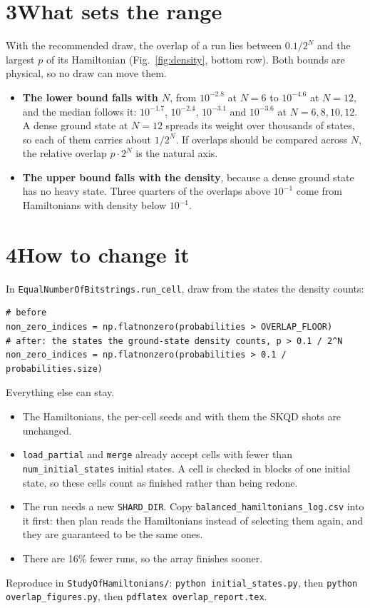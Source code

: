\documentclass[10pt,a4paper]{article}
\begin{document}
\section*{3\quad What sets the range}
With the recommended draw, the overlap of a run lies between $0.1/2^N$ and the largest $p$ of
its Hamiltonian (Fig.~\ref{fig:density}, bottom row). Both bounds are physical, so no draw can
move them.
\begin{itemize}
\item \textbf{The lower bound falls with $N$}, from $10^{-2.8}$ at $N=6$ to $10^{-4.6}$ at
  $N=12$, and the median follows it: $10^{-1.7}$, $10^{-2.4}$, $10^{-3.1}$ and $10^{-3.6}$ at
  $N=6,8,10,12$. A dense ground state at $N=12$ spreads its weight over thousands of states,
  so each of them carries about $1/2^N$. If overlaps should be compared across $N$, the
  relative overlap $p\cdot2^N$ is the natural axis.
\item \textbf{The upper bound falls with the density}, because a dense ground state has no
  heavy state. Three quarters of the overlaps above $10^{-1}$ come from Hamiltonians with
  density below $10^{-1}$.
\end{itemize}

\section*{4\quad How to change it}
In \texttt{EqualNumberOfBitstrings.run\_cell}, draw from the states the density counts:
\begin{lstlisting}
# before
non_zero_indices = np.flatnonzero(probabilities > OVERLAP_FLOOR)
# after: the states the ground-state density counts, p > 0.1 / 2^N
non_zero_indices = np.flatnonzero(probabilities > 0.1 / probabilities.size)
\end{lstlisting}
Everything else can stay.
\begin{itemize}
\item The Hamiltonians, the per-cell seeds and with them the SKQD shots are unchanged.
\item \texttt{load\_partial} and \texttt{merge} already accept cells with fewer than
  \texttt{num\_initial\_states} initial states. A cell is checked in blocks of one initial
  state, so these cells count as finished rather than being redone.
\item The run needs a new \texttt{SHARD\_DIR}. Copy \texttt{balanced\_hamiltonians\_log.csv}
  into it first: then plan reads the Hamiltonians instead of selecting them again, and they
  are guaranteed to be the same ones.
\item There are 16\% fewer runs, so the array finishes sooner.
\end{itemize}

\vspace{4pt}
\noindent\small Reproduce in \texttt{StudyOfHamiltonians/}: \texttt{python initial\_states.py},
then \texttt{python overlap\_figures.py}, then \texttt{pdflatex overlap\_report.tex}.
\end{document}
